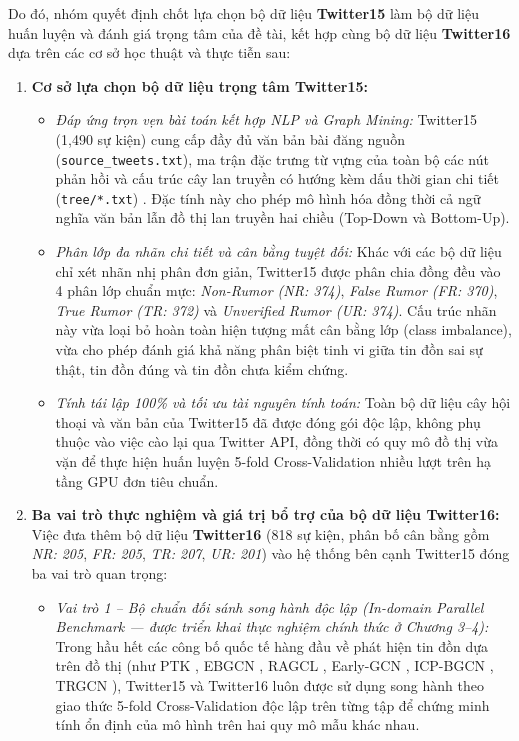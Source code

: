 \documentclass[11pt,a4paper]{extreport}
\begin{document}
Do đó, nhóm quyết định chốt lựa chọn bộ dữ liệu \textbf{Twitter15} làm bộ dữ liệu huấn luyện và đánh giá trọng tâm của đề tài, kết hợp cùng bộ dữ liệu \textbf{Twitter16} dựa trên các cơ sở học thuật và thực tiễn sau:
\begin{enumerate}
    \item \textbf{Cơ sở lựa chọn bộ dữ liệu trọng tâm Twitter15:}
    \begin{itemize}
        \item \textit{Đáp ứng trọn vẹn bài toán kết hợp NLP và Graph Mining:} Twitter15 (1,490 sự kiện) cung cấp đầy đủ văn bản bài đăng nguồn (\texttt{source\_tweets.txt}), ma trận đặc trưng từ vựng của toàn bộ các nút phản hồi và cấu trúc cây lan truyền có hướng kèm dấu thời gian chi tiết (\texttt{tree/*.txt}) \cite{ma_detect_2017, noauthor_integrating_2025}. Đặc tính này cho phép mô hình hóa đồng thời cả ngữ nghĩa văn bản lẫn đồ thị lan truyền hai chiều (Top-Down và Bottom-Up).
        \item \textit{Phân lớp đa nhãn chi tiết và cân bằng tuyệt đối:} Khác với các bộ dữ liệu chỉ xét nhãn nhị phân đơn giản, Twitter15 được phân chia đồng đều vào 4 phân lớp chuẩn mực: \textit{Non-Rumor (NR: 374)}, \textit{False Rumor (FR: 370)}, \textit{True Rumor (TR: 372)} và \textit{Unverified Rumor (UR: 374)}. Cấu trúc nhãn này vừa loại bỏ hoàn toàn hiện tượng mất cân bằng lớp (class imbalance), vừa cho phép đánh giá khả năng phân biệt tinh vi giữa tin đồn sai sự thật, tin đồn đúng và tin đồn chưa kiểm chứng.
        \item \textit{Tính tái lập 100\% và tối ưu tài nguyên tính toán:} Toàn bộ dữ liệu cây hội thoại và văn bản của Twitter15 đã được đóng gói độc lập, không phụ thuộc vào việc cào lại qua Twitter API, đồng thời có quy mô đồ thị vừa vặn để thực hiện huấn luyện 5-fold Cross-Validation nhiều lượt trên hạ tầng GPU đơn tiêu chuẩn.
    \end{itemize}
    \item \textbf{Ba vai trò thực nghiệm và giá trị bổ trợ của bộ dữ liệu Twitter16:}
    Việc đưa thêm bộ dữ liệu \textbf{Twitter16} (818 sự kiện, phân bố cân bằng gồm \textit{NR: 205}, \textit{FR: 205}, \textit{TR: 207}, \textit{UR: 201}) vào hệ thống bên cạnh Twitter15 đóng ba vai trò quan trọng:
    \begin{itemize}
        \item \textit{Vai trò 1 -- Bộ chuẩn đối sánh song hành độc lập (In-domain Parallel Benchmark --- được triển khai thực nghiệm chính thức ở Chương 3--4):} Trong hầu hết các công bố quốc tế hàng đầu về phát hiện tin đồn dựa trên đồ thị (như PTK \cite{ma_detect_2017}, EBGCN \cite{wei_towards_2021}, RAGCL \cite{cui_propagation_2024}, Early-GCN \cite{noauthor_early_2025}, ICP-BGCN \cite{noauthor_integrating_2025}, TRGCN \cite{yan_trgcn_2026}), Twitter15 và Twitter16 luôn được sử dụng song hành theo giao thức 5-fold Cross-Validation độc lập trên từng tập để chứng minh tính ổn định của mô hình trên hai quy mô mẫu khác nhau.

\end{itemize}
\end{enumerate}
\end{document}
